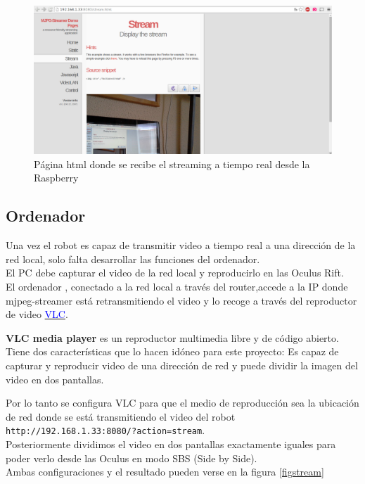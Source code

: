 \documentclass[twoside, 11pt]{epstfg}
\begin{document}
\begin{figure}[H]
	\centerline{
		\mbox{\includegraphics[width=.80\textwidth]{images/pagStream.png}}
	}
	\caption{Página html donde se recibe el streaming a tiempo real desde la Raspberry }
	\label{fig::stream}
\end{figure}


\subsection{Ordenador}
Una vez el robot es capaz de transmitir video a tiempo real a una dirección de la red local, solo falta desarrollar las funciones del ordenador.\\
El PC debe capturar el video de la red local y reproducirlo en las Oculus Rift.\\
El ordenador , conectado a la red local a través del router,accede a la IP donde mjpeg-streamer está retransmitiendo el video y lo recoge a través del reproductor de video  \href{http://www.videolan.org/vlc/}{\textcolor{blue}{VLC}}.

\textbf{VLC media player} es un reproductor multimedia libre y de código abierto. Tiene dos características que lo hacen idóneo para este proyecto: Es capaz de capturar y reproducir video de una dirección de red y puede dividir la imagen del video en dos pantallas.

Por lo tanto se configura VLC para que el medio de reproducción sea la ubicación de red donde se está transmitiendo el video del robot \texttt{http://192.168.1.33:8080/?action=stream}.\\
Posteriormente dividimos el video en dos pantallas exactamente iguales para poder verlo desde las Oculus en modo SBS (Side by Side).\\Ambas configuraciones y el resultado pueden verse en la figura \ref{figstream}
\end{document}
